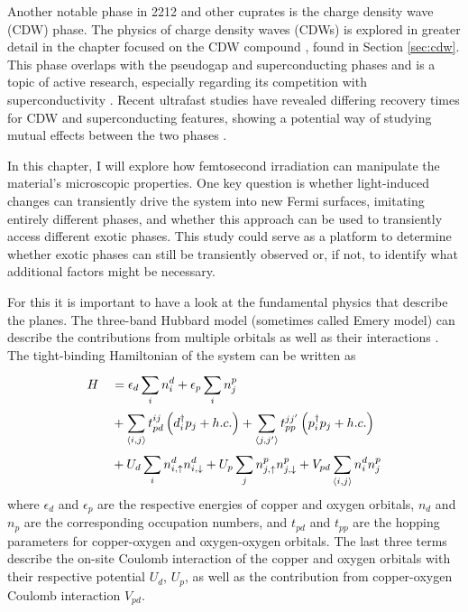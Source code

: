 Another notable phase in 2212 and other cuprates is the charge density wave (CDW) phase.
The physics of charge density waves (CDWs) is explored in greater detail in the chapter focused on the CDW compound , found in Section \ref{sec:cdw}.
This phase overlaps with the pseudogap and superconducting phases and is a topic of active research, especially regarding its competition with superconductivity \cite{arpaia_charge_2021}.
Recent ultrafast studies have revealed differing recovery times for CDW and superconducting features, showing a potential way of studying mutual effects between the two phases \cite{wandel_enhanced_2022}.

In this chapter, I will explore how femtosecond irradiation can manipulate the material's microscopic properties.
One key question is whether light-induced changes can transiently drive the system into new Fermi surfaces, imitating entirely different phases, and whether this approach can be used to transiently access different exotic phases.
This study could serve as a platform to determine whether exotic phases can still be transiently observed or, if not, to identify what additional factors might be necessary.

For this it is important to have a look at the fundamental physics that describe the  planes.
The three-band Hubbard model (sometimes called Emery model) can describe the contributions from multiple orbitals as well as their interactions \cite{avella_emery_2013,emery_theory_1987,ogata_tj_2008}.
The tight-binding Hamiltonian of the system can be written as
\begin{equation}
\begin{split}
	H &\quad = \epsilon_d \sum_{i}^{} n_i^d + \epsilon_p \sum_{i}^{} n_j^p \\
	  &\quad + \sum_{\braket{i,j}}^{} t_{pd}^{ij} \left(d_i^\dagger p_j + h.c.\right) + \sum_{\braket{j,j'}}^{} t_{pp}^{jj'} \left(p_i^\dagger p_j + h.c.\right)\\
	  &\quad + U_d \sum_{i}^{} n_{i,\uparrow}^d n_{i,\downarrow}^d + U_p \sum_{j}^{} n_{j,\uparrow}^p n_{j,\downarrow}^p + V_{pd} \sum_{\braket{i,j}}^{} n_i^d n_j^p
\end{split}
\end{equation}
where $\epsilon_d$ and $\epsilon_p$ are the respective energies of copper and oxygen orbitals, $n_d$ and $n_p$ are the corresponding occupation numbers, and $t_{pd}$ and $t_{pp}$ are the hopping parameters for copper-oxygen and oxygen-oxygen orbitals.
The last three terms describe the on-site Coulomb interaction of the copper and oxygen orbitals with their respective potential $U_d$, $U_p$, as well as the contribution from copper-oxygen Coulomb interaction $V_{pd}$.

